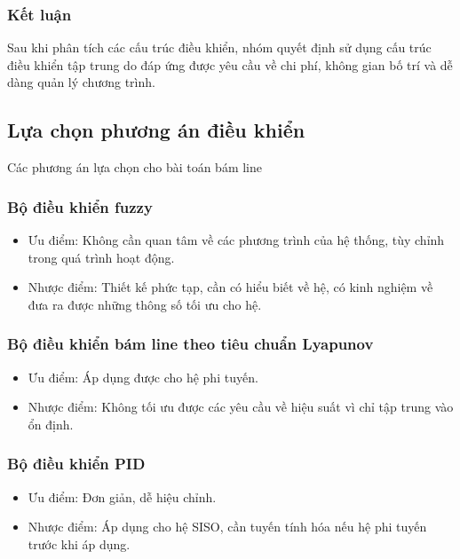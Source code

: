                 \subsubsection{Kết luận}
                    \hspace*{0.6cm}Sau khi phân tích các cấu trúc điều khiển, nhóm quyết định sử dụng cấu trúc điều khiển tập trung do đáp ứng được yêu cầu về chi phí, không gian bố trí và dễ dàng quản lý chương trình.
            \subsection{Lựa chọn phương án điều khiển}
            Các phương án lựa chọn cho bài toán bám line
                \subsubsection{Bộ điều khiển fuzzy}
                    \begin{itemize}
                        \item Ưu điểm: Không cần quan tâm về các phương trình của hệ thống, tùy chỉnh trong quá trình hoạt động.
                        \item Nhược điểm: Thiết kế phức tạp, cần có hiểu biết về hệ, có kinh nghiệm về đưa ra được những thông số tối ưu cho hệ.
                    \end{itemize}
                \subsubsection{Bộ điều khiển bám line theo tiêu chuẩn Lyapunov}
                    \begin{itemize}
                        \item Ưu điểm: Áp dụng được cho hệ phi tuyến.
                        \item Nhược điểm: Không tối ưu được các yêu cầu về hiệu suất vì chỉ tập trung vào ổn định.
                    \end{itemize}
                \subsubsection{Bộ điều khiển PID}
                    \begin{itemize}
                        \item Ưu điểm: Đơn giản, dễ hiệu chỉnh.
                        \item Nhược điểm: Áp dụng cho hệ SISO, cần tuyến tính hóa nếu hệ phi tuyến trước khi áp dụng.
                    \end{itemize}
